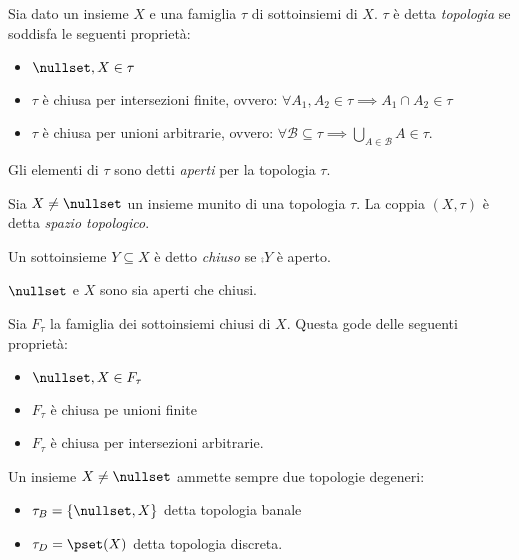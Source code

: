 


\begin{defn}[Topologia]
Sia dato un insieme $X$ e una famiglia $\tau$ di sottoinsiemi di $X$. $\tau$ è detta \emph{topologia} se soddisfa le seguenti proprietà:
\begin{itemize}
\item $\nullset,X\in\tau$ 
\item$\tau$ è chiusa per intersezioni finite, ovvero: $\forall A_1, A_2 \in \tau \implies A_1 \cap A_2 \in \tau$
\item $\tau$ è chiusa per unioni arbitrarie, ovvero: $\forall \mathcal B \subseteq \tau \implies \bigcup_{A\in\mathcal B} A \in \tau$.
\end{itemize}
Gli elementi di $\tau$ sono detti \emph{aperti} per la topologia $\tau$.
\end{defn}

\begin{defn}
Sia $X \neq \nullset$ un insieme munito di una topologia $\tau$. La coppia $(X,\tau)$ è detta \emph{spazio topologico}.
\end{defn}
\begin{defn}[Chiuso]
Un sottoinsieme $Y \subseteq X$ è detto \emph{chiuso} se $\comp Y$ è aperto.
\end{defn}

\begin{oss}
$\nullset$ e $X$ sono sia aperti che chiusi.
\end{oss}

\begin{prop}
Sia $F_\tau$ la famiglia dei sottoinsiemi chiusi di $X$. Questa gode delle seguenti proprietà:
\begin{itemize}
\item $\nullset ,X \in F_\tau$ 
\item $F_\tau$ è chiusa pe unioni finite
\item $F_\tau$ è chiusa per intersezioni arbitrarie.
\end{itemize}
\end{prop}

\begin{oss}
Un insieme $X\neq\nullset$ ammette sempre due topologie degeneri:
\begin{itemize}
\item $\tau_B = \{\nullset,X\}$ detta topologia banale
\item $\tau_D = \pset(X)$ detta topologia discreta.
\end{itemize}
\end{oss}

